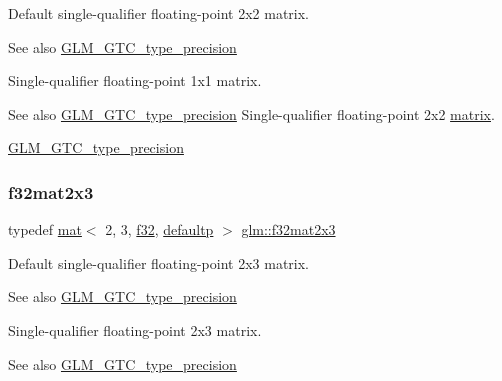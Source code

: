Default single-\/qualifier floating-\/point 2x2 matrix. \begin{DoxySeeAlso}{See also}
\mbox{\hyperlink{group__gtc__type__precision}{G\+L\+M\+\_\+\+G\+T\+C\+\_\+type\+\_\+precision}}
\end{DoxySeeAlso}
Single-\/qualifier floating-\/point 1x1 matrix. \begin{DoxySeeAlso}{See also}
\mbox{\hyperlink{group__gtc__type__precision}{G\+L\+M\+\_\+\+G\+T\+C\+\_\+type\+\_\+precision}} Single-\/qualifier floating-\/point 2x2 \mbox{\hyperlink{_s_d_l__opengl__glext_8h_a7b24a3f2f56eb1244ae69dacb4fecb6f}{matrix}}. 

\mbox{\hyperlink{group__gtc__type__precision}{G\+L\+M\+\_\+\+G\+T\+C\+\_\+type\+\_\+precision}} 
\end{DoxySeeAlso}
\mbox{\label{group__gtc__type__precision_ga1f5a1129669d427f5fbc5f02ff52c366}} 
\subsubsection{\texorpdfstring{f32mat2x3}{f32mat2x3}}
{\footnotesize\ttfamily typedef \mbox{\hyperlink{structglm_1_1mat}{mat}}$<$ 2, 3, \mbox{\hyperlink{group__gtc__type__precision_ga0ec999b57f5330d9021256e96038df04}{f32}}, \mbox{\hyperlink{namespaceglm_a36ed105b07c7746804d7fdc7cc90ff25a9d21ccd8b5a009ec7eb7677befc3bf51}{defaultp}} $>$ \mbox{\hyperlink{group__gtc__type__precision_ga1f5a1129669d427f5fbc5f02ff52c366}{glm\+::f32mat2x3}}}

Default single-\/qualifier floating-\/point 2x3 matrix. \begin{DoxySeeAlso}{See also}
\mbox{\hyperlink{group__gtc__type__precision}{G\+L\+M\+\_\+\+G\+T\+C\+\_\+type\+\_\+precision}}
\end{DoxySeeAlso}
Single-\/qualifier floating-\/point 2x3 matrix. \begin{DoxySeeAlso}{See also}
\mbox{\hyperlink{group__gtc__type__precision}{G\+L\+M\+\_\+\+G\+T\+C\+\_\+type\+\_\+precision}} 
\end{DoxySeeAlso}
\mbox{\label{group__gtc__type__precision_ga56deb277c1d5c1f42a80982372b4ed6c}} 
